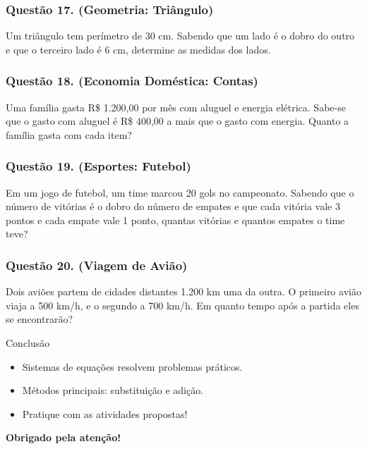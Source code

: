 \documentclass[12pt]{beamer}
\begin{document}
\begin{frame}
\frametitle{Questão 17. (Geometria: Triângulo)}
Um triângulo tem perímetro de 30 cm. Sabendo que um lado é o dobro do outro e que o terceiro lado é 6 cm, determine as medidas dos lados.
\end{frame}

\begin{frame}
\frametitle{Questão 18. (Economia Doméstica: Contas)}
Uma família gasta R\$ 1.200,00 por mês com aluguel e energia elétrica. Sabe-se que o gasto com aluguel é R\$ 400,00 a mais que o gasto com energia. Quanto a família gasta com cada item?
\end{frame}

\begin{frame}
\frametitle{Questão 19. (Esportes: Futebol)}
Em um jogo de futebol, um time marcou 20 gols no campeonato. Sabendo que o número de vitórias é o dobro do número de empates e que cada vitória vale 3 pontos e cada empate vale 1 ponto, quantas vitórias e quantos empates o time teve?
\end{frame}

\begin{frame}
\frametitle{Questão 20. (Viagem de Avião)}
Dois aviões partem de cidades distantes 1.200 km uma da outra. O primeiro avião viaja a 500 km/h, e o segundo a 700 km/h. Em quanto tempo após a partida eles se encontrarão?
\end{frame}

\begin{frame}{Conclusão}
\begin{itemize}
\item Sistemas de equações resolvem problemas práticos.
\item Métodos principais: substituição e adição.
\item Pratique com as atividades propostas!
\end{itemize}

\centering
\textbf{Obrigado pela atenção!}
\end{frame}
\end{document}
